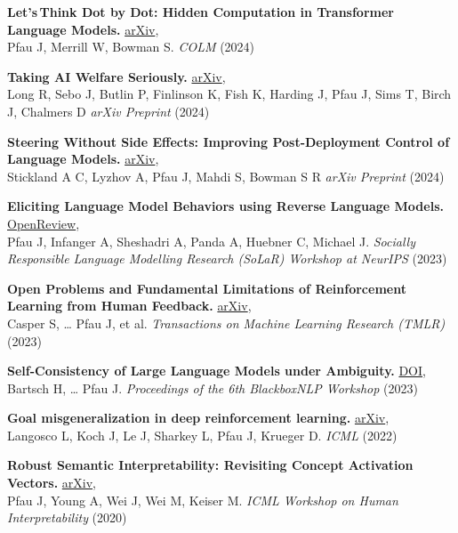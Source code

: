 \documentclass[11pt,letterpaper]{article}
\begin{document}
\textbf{Let's\,Think Dot by Dot: Hidden Computation in Transformer Language Models.}
\href{https://doi.org/10.48550/arXiv.2404.15758}{arXiv},\\
Pfau J, Merrill W, Bowman S. \textit{COLM} (2024)
\vspace{3pt}

\textbf{Taking AI Welfare Seriously.}
\href{https://doi.org/10.48550/arXiv.2411.00986}{arXiv},\\
Long R, Sebo J, Butlin P, Finlinson K, Fish K, Harding J, Pfau J, Sims T, Birch J, Chalmers D \textit{arXiv Preprint} (2024)
\vspace{3pt}

\textbf{Steering Without Side Effects: Improving Post-Deployment Control of Language Models.}
\href{https://doi.org/10.48550/arXiv.2406.15518}{arXiv},\\
Stickland A C, Lyzhov A, Pfau J, Mahdi S, Bowman S R \textit{arXiv Preprint} (2024)
\vspace{3pt}


\textbf{Eliciting Language Model Behaviors using Reverse Language Models.}
\href{https://openreview.net/pdf?id=m6xyTie61H}{OpenReview},\\
Pfau J, Infanger A, Sheshadri A, Panda A, Huebner C, Michael J. \textit{Socially\, Responsible Language Modelling Research (SoLaR) Workshop at NeurIPS} (2023)
\vspace{3pt}

\textbf{Open Problems and Fundamental Limitations of Reinforcement Learning from Human Feedback.}
\href{https://doi.org/10.48550/arXiv.2307.15217}{arXiv},\\
Casper S, \dots{} Pfau J, et al. \textit{Transactions on Machine Learning Research (TMLR)} (2023)
\vspace{3pt}

\textbf{Self-Consistency of Large Language Models under Ambiguity.}
\href{https://doi.org/10.18653/v1/2023.blackboxnlp-1.7}{DOI},\\
Bartsch H, \dots{} Pfau J. \textit{Proceedings of the 6th BlackboxNLP Workshop} (2023)
\vspace{3pt}

\textbf{Goal misgeneralization in deep reinforcement learning.}
\href{https://doi.org/10.48550/arXiv.2105.14111}{arXiv},\\
Langosco L, Koch J,  Le J, Sharkey L, Pfau J, Krueger D. \textit{ICML} (2022)
\vspace{3pt}

\textbf{Robust Semantic Interpretability: Revisiting Concept Activation Vectors.}
\href{https://doi.org/10.48550/arXiv.2104.02768}{arXiv},\\
Pfau J, Young A, Wei J, Wei M, Keiser M. \textit{ICML Workshop on Human Interpretability} (2020)
\vspace{3pt}
\end{document}
